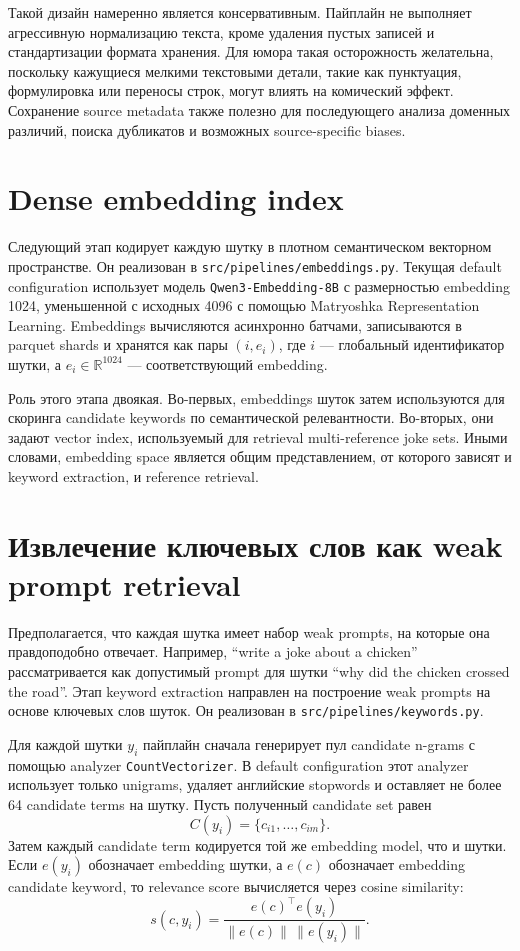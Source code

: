 Такой дизайн намеренно является консервативным. Пайплайн не выполняет агрессивную нормализацию текста, кроме удаления пустых записей и стандартизации формата хранения. Для юмора такая осторожность желательна, поскольку кажущиеся мелкими текстовыми детали, такие как пунктуация, формулировка или переносы строк, могут влиять на комический эффект. Сохранение source metadata также полезно для последующего анализа доменных различий, поиска дубликатов и возможных source-specific biases.

\section{Dense embedding index}

Следующий этап кодирует каждую шутку в плотном семантическом векторном пространстве. Он реализован в \texttt{src/pipelines/embeddings.py}. Текущая default configuration использует модель \texttt{Qwen3-Embedding-8B} с размерностью embedding 1024, уменьшенной с исходных 4096 с помощью Matryoshka Representation Learning. Embeddings вычисляются асинхронно батчами, записываются в parquet shards и хранятся как пары \((i, e_i)\), где \(i\) --- глобальный идентификатор шутки, а \(e_i \in \mathbb{R}^{1024}\) --- соответствующий embedding.

Роль этого этапа двоякая. Во-первых, embeddings шуток затем используются для скоринга candidate keywords по семантической релевантности. Во-вторых, они задают vector index, используемый для retrieval multi-reference joke sets. Иными словами, embedding space является общим представлением, от которого зависят и keyword extraction, и reference retrieval.

\section{Извлечение ключевых слов как weak prompt retrieval}

Предполагается, что каждая шутка имеет набор weak prompts, на которые она правдоподобно отвечает. Например, ``write a joke about a chicken'' рассматривается как допустимый prompt для шутки ``why did the chicken crossed the road''. Этап keyword extraction направлен на построение weak prompts на основе ключевых слов шуток. Он реализован в \texttt{src/pipelines/keywords.py}.

Для каждой шутки \(y_i\) пайплайн сначала генерирует пул candidate n-grams с помощью analyzer \texttt{CountVectorizer}. В default configuration этот analyzer использует только unigrams, удаляет английские stopwords и оставляет не более 64 candidate terms на шутку. Пусть полученный candidate set равен
\[
    C(y_i)=\{c_{i1},\dots,c_{im}\}.
\]
Затем каждый candidate term кодируется той же embedding model, что и шутки. Если \(e(y_i)\) обозначает embedding шутки, а \(e(c)\) обозначает embedding candidate keyword, то relevance score вычисляется через cosine similarity:
\[
    s(c,y_i)=\frac{e(c)^\top e(y_i)}{\lVert e(c)\rVert\,\lVert e(y_i)\rVert}.
\]

